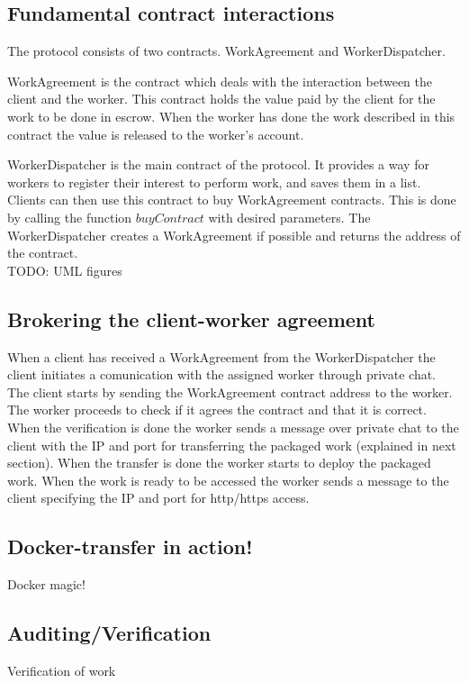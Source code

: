 \subsection{Fundamental contract interactions}
The protocol consists of two contracts. WorkAgreement and  WorkerDispatcher.

WorkAgreement is the contract which deals with the interaction between the client and the worker. This contract holds the value paid by the client for the work to be done in escrow. When the worker has done the work described in this contract the value is released to the worker's account.

WorkerDispatcher is the main contract of the protocol. It provides a way for workers to register their interest to perform work, and saves them in a list. Clients can then use this contract to buy WorkAgreement contracts. This is done by calling the function $buyContract$ with desired parameters. The WorkerDispatcher creates a WorkAgreement if possible and returns the address of the contract.
\\TODO: UML figures

\subsection{Brokering the client-worker agreement}
When a client has received a WorkAgreement from the WorkerDispatcher the client initiates a comunication with the assigned worker through private chat. The client starts by sending the WorkAgreement contract address to the worker. The worker proceeds to check if it agrees the contract and that it is correct. When the verification is done the worker sends a message over private chat to the client with the IP and port for transferring the packaged work (explained in next section). When the transfer is done the worker starts to deploy the packaged work. When the work is ready to be accessed the worker sends a message to the client specifying the IP and port for http/https access.

\subsection{Docker-transfer in action!}
Docker magic!

\subsection{Auditing/Verification}
Verification of work

